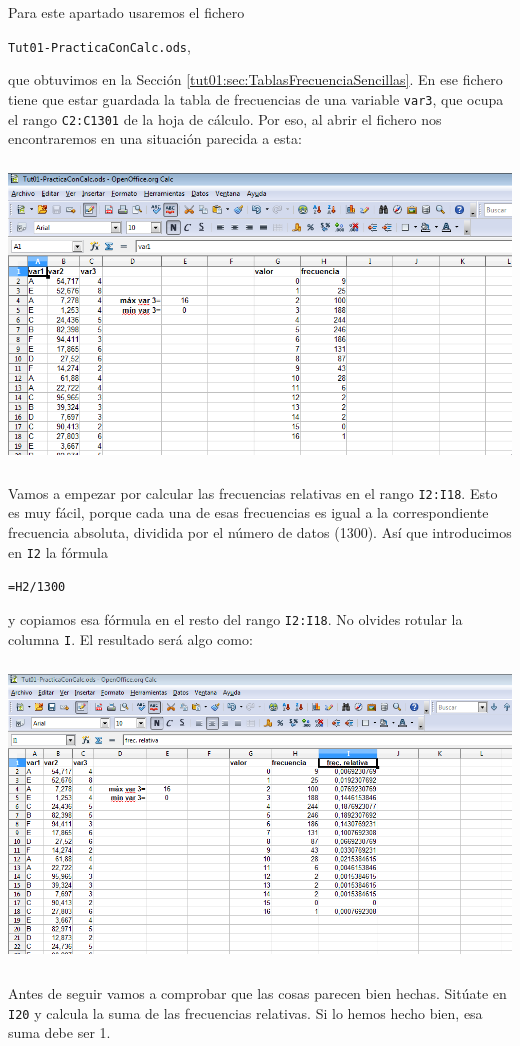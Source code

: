 \documentclass[10pt,a4paper]{article}\usepackage[]{graphicx}\usepackage[]{color}
\newcounter {cont01}
\begin{document}
Para este apartado usaremos el  fichero
\begin{center}
{\tt Tut01-PracticaConCalc.ods},
\end{center}
que obtuvimos en la Sección \ref{tut01:sec:TablasFrecuenciaSencillas}. En ese fichero tiene que estar guardada la tabla de frecuencias de una variable {\tt var3}, que ocupa el rango  {\tt C2:C1301} de la hoja de cálculo. Por eso, al abrir el fichero nos encontraremos en una situación parecida a esta:
    \begin{center}
    \includegraphics[height=8cm]{../fig/Tut03-04.png}
    \end{center}
Vamos a empezar por calcular las frecuencias relativas en el rango {\tt I2:I18}.  Esto es muy fácil, porque cada una de esas frecuencias es igual a la correspondiente frecuencia absoluta, dividida por el número de datos (1300).  Así que introducimos en {\tt I2} la fórmula
\begin{center}
{\tt =H2/1300}
\end{center}
y copiamos esa fórmula en el resto del rango {\tt I2:I18}. No olvides rotular la columna {\tt I}. El resultado será algo como:
    \begin{center}
    \includegraphics[height=8cm]{../fig/Tut03-05.png}
    \end{center}
Antes de seguir vamos a comprobar que las cosas parecen bien hechas. Sitúate en {\tt I20} y calcula la suma de las frecuencias relativas. Si lo hemos hecho bien, esa suma debe ser 1.
\end{document}
